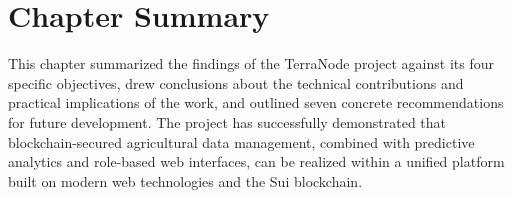 \section{Chapter Summary}

This chapter summarized the findings of the TerraNode project against its four specific objectives, drew conclusions about the technical contributions and practical implications of the work, and outlined seven concrete recommendations for future development. The project has successfully demonstrated that blockchain-secured agricultural data management, combined with predictive analytics and role-based web interfaces, can be realized within a unified platform built on modern web technologies and the Sui blockchain.
